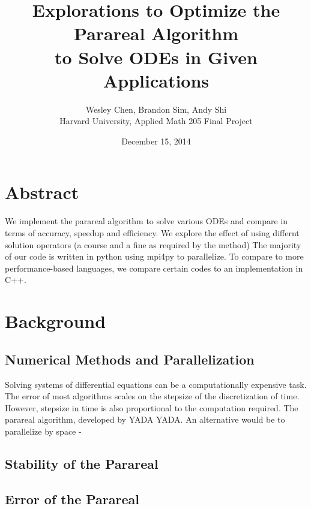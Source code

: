 \documentclass[letterpaper,twocolumn,11pt]{article}
\begin{document}
\title{Explorations to Optimize the Parareal Algorithm \\to Solve ODEs in Given Applications}
\author{Wesley Chen, Brandon Sim, Andy Shi \\
Harvard University, Applied Math 205 Final Project}
\date{December 15, 2014}
\maketitle

\setlength\parindent{0pt}

\setlength\parskip{2ex}


\section{Abstract}

We implement the parareal algorithm to solve various ODEs and compare in terms of accuracy, speedup and efficiency.  We explore the effect of using differnt solution operators (a course and a fine as required by the method)  The majority of our code is written in python using mpi4py to parallelize.  To compare to more performance-based languages, we compare certain codes to an implementation in C++.

\section{Background}

\subsection{Numerical Methods and Parallelization}
Solving systems of differential equations can be a computationally expensive task.  The error of most algorithms scales on the stepsize of the discretization of time.  However, stepsize in time is also proportional to the computation required.  The parareal algorithm, developed by YADA YADA.  An alternative would be to parallelize by space - 

\subsection{Stability of the Parareal}

\subsection{Error of the Parareal}
\end{document}

